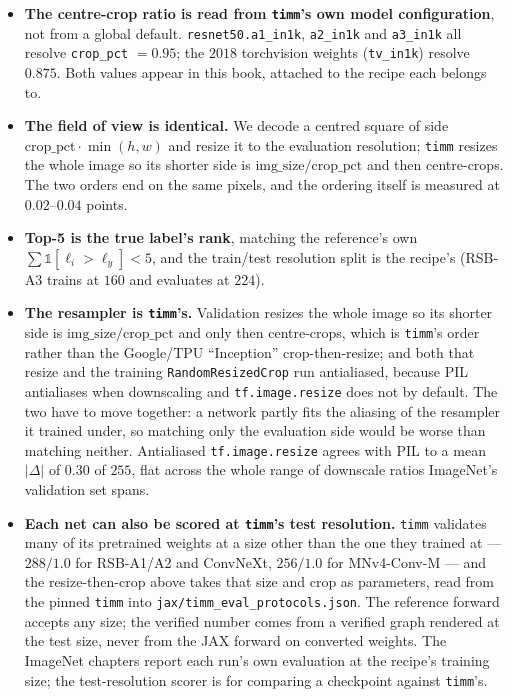 \begin{itemize}
  \item \textbf{The centre-crop ratio is read from \texttt{timm}'s own
    model configuration}, not from a global default.
    \texttt{resnet50.a1\_in1k}, \texttt{a2\_in1k} and \texttt{a3\_in1k}
    all resolve \texttt{crop\_pct} $= 0.95$; the $2018$ torchvision
    weights (\texttt{tv\_in1k}) resolve $0.875$. Both values appear in
    this book, attached to the recipe each belongs to.
  \item \textbf{The field of view is identical.} We decode a centred
    square of side $\mathrm{crop\_pct} \cdot \min(h,w)$ and resize it to
    the evaluation resolution; \texttt{timm} resizes the whole image so
    its shorter side is $\mathrm{img\_size}/\mathrm{crop\_pct}$ and then
    centre-crops. The two orders end on the same pixels, and the
    ordering itself is measured at $0.02$--$0.04$ points.
  \item \textbf{Top-5 is the true label's rank}, matching the
    reference's own $\sum \mathbb{1}[\ell_i > \ell_y] < 5$, and the
    train/test resolution split is the recipe's (RSB-A3 trains at $160$
    and evaluates at $224$).
  \item \textbf{The resampler is \texttt{timm}'s.} Validation resizes
    the whole image so its shorter side is
    $\mathrm{img\_size}/\mathrm{crop\_pct}$ and only then centre-crops,
    which is \texttt{timm}'s order rather than the Google/TPU
    ``Inception'' crop-then-resize; and both that resize and the
    training \texttt{RandomResizedCrop} run antialiased, because
    PIL antialiases when downscaling and \texttt{tf.image.resize} does
    not by default. The two have to move together: a network partly
    fits the aliasing of the resampler it trained under, so matching
    only the evaluation side would be worse than matching neither.
    Antialiased \texttt{tf.image.resize} agrees with PIL to a mean
    $|\Delta|$ of $0.30$ of $255$, flat across the whole range of
    downscale ratios ImageNet's validation set spans.
  \item \textbf{Each net can also be scored at \texttt{timm}'s test
    resolution.} \texttt{timm} validates many of its pretrained weights
    at a size other than the one they trained at --- $288 / 1.0$ for
    RSB-A1/A2 and ConvNeXt, $256 / 1.0$ for MNv4-Conv-M --- and the
    resize-then-crop above takes that size and crop as parameters, read
    from the pinned \texttt{timm} into
    \texttt{jax/timm\_eval\_protocols.json}. The reference forward
    accepts any size; the verified number comes from a verified graph
    rendered at the test size, never from the JAX forward on converted
    weights. The ImageNet chapters report each run's own evaluation at
    the recipe's training size; the test-resolution scorer is for
    comparing a checkpoint against \texttt{timm}'s.
\end{itemize}

